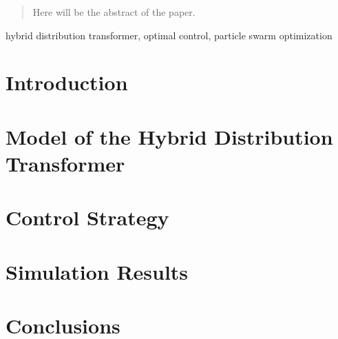 





\maketitle

\begin{abstract}
Here will be the abstract of the paper.
\end{abstract}

\begin{IEEEkeywords}
    hybrid distribution transformer, optimal control, particle swarm optimization
\end{IEEEkeywords}

\section{Introduction}



\section{Model of the Hybrid Distribution Transformer}



\section{Control Strategy}



\section{Simulation Results}



\section{Conclusions}




\clearpage




